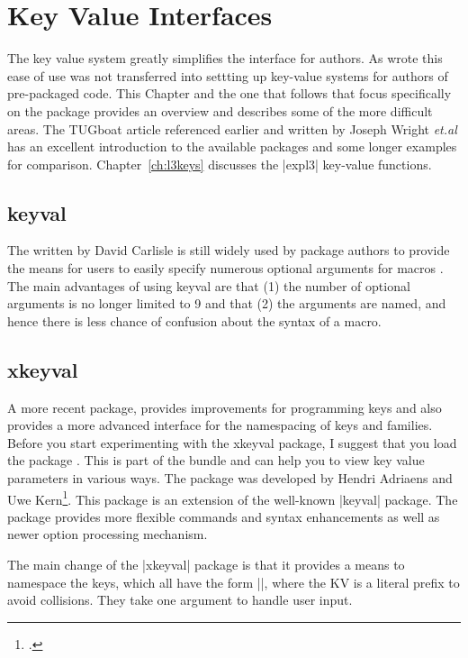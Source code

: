 \chapter{Key Value Interfaces}

The key value system greatly simplifies the \tex interface for authors. As \cite{joseph2009} wrote this ease of use was not transferred into settting up key-value systems for authors of pre-packaged \tex code. This Chapter and the one that follows that focus specifically on the  package provides an overview and describes some of the more difficult areas. The TUGboat article referenced earlier and written by Joseph Wright \textit{et.al} has an excellent introduction to the available packages and some longer examples for comparison. Chapter~\ref{ch:l3keys}
 discusses the |expl3| key-value functions.

\section{keyval}

The  written by David Carlisle is still widely used by package authors to provide the means for users to easily specify numerous optional arguments for macros \cite{keyval}. The main advantages of using keyval are that  (1) the number of optional arguments is no longer limited to 9 and that (2) the arguments are named, and hence there is less chance of confusion about the syntax of a macro.

\section{xkeyval}

A more recent package,  provides improvements for programming keys and  also
provides a more advanced interface for the namespacing of keys and families.
Before you start experimenting with the xkeyval package, I suggest that you load the package . This is part of the   bundle and can help you to view key value parameters in various ways. The  package was developed by Hendri Adriaens and Uwe Kern\footcite{xkeyval}. This package is an extension of the well-known |keyval| package. The package provides more flexible commands and syntax enhancements as well as newer option processing mechanism.

The main change of the |xkeyval| package is that it provides a means to namespace the keys, which all have the form |\KV@family@keyname|, where the KV is a literal prefix to avoid collisions. They take one argument to handle user input.

